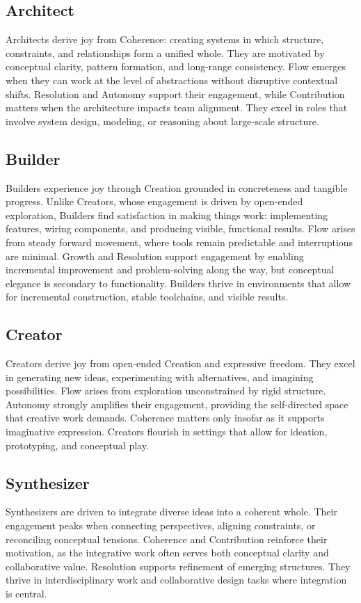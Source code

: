 \documentclass[12pt]{elsarticle}
\begin{document}
\subsection{Architect}
Architects derive joy from Coherence: creating systems in which structure,
constraints, and relationships form a unified whole. They are motivated by
conceptual clarity, pattern formation, and long-range consistency. Flow emerges
when they can work at the level of abstractions without disruptive contextual
shifts. Resolution and Autonomy support their engagement, while Contribution 
matters when the architecture impacts team alignment. They excel in roles that
involve system design, modeling, or reasoning about large-scale structure.

\subsection{Builder}
Builders experience joy through Creation grounded in concreteness and tangible 
progress. Unlike Creators, whose engagement is driven by open-ended 
exploration, Builders find satisfaction in making things work: implementing 
features, wiring components, and producing visible, functional results. Flow 
arises from steady forward movement, where tools remain predictable and 
interruptions are minimal. Growth and Resolution support engagement by 
enabling incremental improvement and problem-solving along the way, but 
conceptual elegance is secondary to functionality. Builders thrive in 
environments that allow for incremental construction, stable toolchains, and 
visible results.

\subsection{Creator}
Creators derive joy from open-ended Creation and expressive freedom. They excel
in generating new ideas, experimenting with alternatives, and imagining 
possibilities. Flow arises from exploration unconstrained by rigid structure.
Autonomy strongly amplifies their engagement, providing the self-directed 
space that creative work demands. Coherence matters only insofar
as it supports imaginative expression. Creators flourish in settings that allow
for ideation, prototyping, and conceptual play.

\subsection{Synthesizer}
Synthesizers are driven to integrate diverse ideas into a coherent 
whole. Their engagement peaks when connecting perspectives, aligning 
constraints, or reconciling conceptual tensions. Coherence and Contribution 
reinforce their motivation, as the integrative work often serves both 
conceptual clarity and collaborative value. Resolution supports refinement of 
emerging structures. They thrive in interdisciplinary work and collaborative 
design tasks where integration is central.
\end{document}
